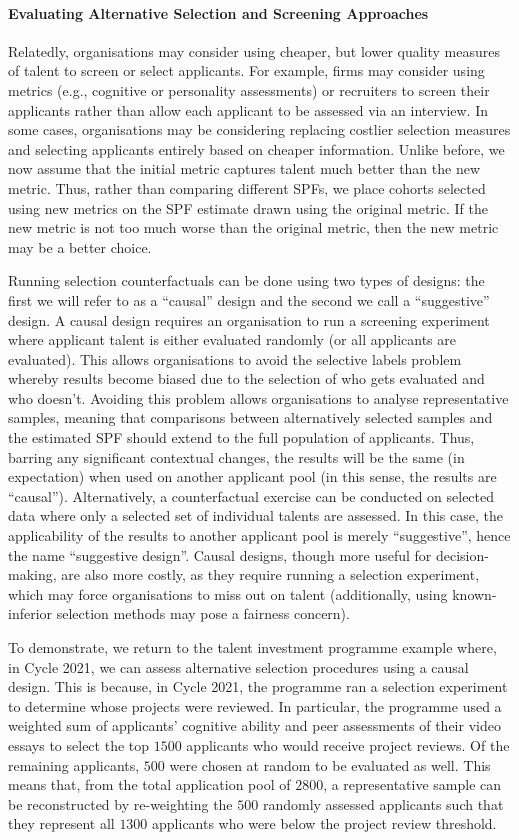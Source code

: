 \paragraph{Evaluating Alternative Selection and Screening Approaches} Relatedly, organisations may consider using cheaper, but lower quality measures of talent to screen or select applicants. For example, firms may consider using metrics (e.g., cognitive or personality assessments) or recruiters to screen their applicants rather than allow each applicant to be assessed via an interview. In some cases, organisations may be considering replacing costlier selection measures and selecting applicants entirely based on cheaper information. Unlike before, we now assume that the initial metric captures talent much better than the new metric. Thus, rather than comparing different SPFs, we place cohorts selected using new metrics on the SPF estimate drawn using the original metric. If the new metric is not too much worse than the original metric, then the new metric may be a better choice.

Running selection counterfactuals can be done using two types of designs: the first we will refer to as a ``causal'' design and the second we call a ``suggestive'' design. A causal design requires an organisation to run a screening experiment where applicant talent is either evaluated randomly (or all applicants are evaluated). This allows organisations to avoid the selective labels problem whereby results become biased due to the selection of who gets evaluated and who doesn't. Avoiding this problem allows organisations to analyse representative samples, meaning that comparisons between alternatively selected samples and the estimated SPF should extend to the full population of applicants. Thus, barring any significant contextual changes, the results will be the same (in expectation) when used on another applicant pool (in this sense, the results are ``causal''). Alternatively, a counterfactual exercise can be conducted on selected data where only a selected set of individual talents are assessed. In this case, the applicability of the results to another applicant pool is merely ``suggestive'', hence the name ``suggestive design''. Causal designs, though more useful for decision-making, are also more costly, as they require running a selection experiment, which may force organisations to miss out on talent (additionally, using known-inferior selection methods may pose a fairness concern). 

To demonstrate, we return to the talent investment programme example where, in Cycle 2021, we can assess alternative selection procedures using a causal design. This is because, in Cycle 2021, the programme ran a selection experiment to determine whose projects were reviewed. In particular, the programme used a weighted sum of applicants' cognitive ability and peer assessments of their video essays to select the top $1500$ applicants who would receive project reviews. Of the remaining applicants, $500$ were chosen at random to be evaluated as well. This means that, from the total application pool of $2800$, a representative sample can be reconstructed by re-weighting the $500$ randomly assessed applicants such that they represent all $1300$ applicants who were below the project review threshold.


